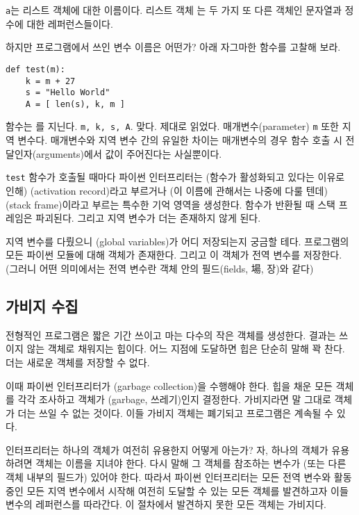 \documentclass[a4paper]{oblivoir}
\begin{document}
 \texttt{a}는 리스트 객체에 대한 이름이다. 리스트 객체 는 두 가지 또 다른 객체인 문자열과 정수에 대한 레퍼런스들이다. 

하지만 프로그램에서 쓰인 변수 이름은 어떤가? 아래 자그마한 함수를 고찰해 보라.

\begin{verbatim}
def test(m):
    k = m + 27
    s = "Hello World"
    A = [ len(s), k, m ]
\end{verbatim}

 함수는 를 지닌다. \texttt{m, k, s, A}. 맞다. 제대로 읽었다. 매개변수(parameter) \texttt{m} 또한 지역 변수다. 매개변수와 지역 변수 간의 유일한 차이는 매개변수의 경우 함수 호출 시 전달인자(arguments)에서 값이 주어진다는 사실뿐이다.

\texttt{test} 함수가 호출될 때마다 파이썬 인터프리터는 (함수가 활성화되고 있다는 이유로 인해) (activation record)라고 부르거나 (이 이름에 관해서는 나중에 다룰 텐데) (stack frame)이라고 부르는 특수한 기억 영역을 생성한다. 함수가 반환될 때 스택 프레임은 파괴된다. 그리고  지역 변수가 더는 존재하지 않게 된다.

지역 변수를 다뤘으니 (global variables)가 어디 저장되는지 궁금할 테다. 프로그램의 모든 파이썬 모듈에 대해 객체가 존재한다. 그리고 이 객체가 전역 변수를 저장한다. (그러니 어떤 의미에서는 전역 변수란 객체 안의 필드(fields, 場, 장)와 같다)

\subsection*{가비지 수집}

전형적인 프로그램은 짧은 기간 쓰이고 마는 다수의 작은 객체를 생성한다. 결과는 쓰이지 않는 객체로 채워지는 힙이다. 어느 지점에 도달하면 힙은 단순히 말해 꽉 찬다. 더는 새로운 객체를 저장할 수 없다.

이때 파이썬 인터프리터가 (garbage collection)을 수행해야 한다.  힙을 채운 모든 객체를 각각 조사하고 객체가 (garbage, 쓰레기)인지 결정한다. 가비지라면 말 그대로 객체가 더는 쓰일 수 없는 것이다. 이들 가비지 객체는 폐기되고 프로그램은 계속될 수 있다.

인터프리터는 하나의 객체가 여전히 유용한지 어떻게 아는가? 자, 하나의 객체가 유용하려면 객체는 이름을 지녀야 한다. 다시 말해 그 객체를 참조하는 변수가 (또는 다른 객체 내부의 필드가) 있어야 한다. 따라서 파이썬 인터프리터는 모든 전역 변수와 활동 중인 모든 지역 변수에서 시작해 여전히 도달할 수 있는 모든 객체를 발견하고자 이들 변수의 레퍼런스를 따라간다. 이 절차에서 발견하지 못한 모든 객체는 가비지다.
\end{document}

